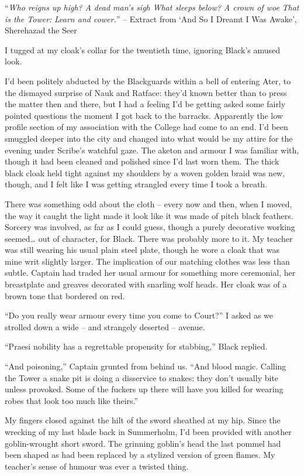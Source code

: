 \documentclass[12pt, openany]{book}
\begin{document}
“\textit{Who reigns up high?}
\textit{A dead man’s sigh}
\textit{What sleeps below?}
\textit{A crown of woe}
\textit{That is the Tower:}
\textit{Learn and cower.}”
– Extract from ‘And So I Dreamt I Was Awake’, Sherehazad the Seer

I tugged at my cloak’s collar for the twentieth time, ignoring Black’s amused look.

I’d been politely abducted by the Blackguards within a bell of entering Ater, to the dismayed surprise of Nauk and Ratface: they’d known better than to press the matter then and there, but I had a feeling I’d be getting asked some fairly pointed questions the moment I got back to the barracks. Apparently the low profile section of my association with the College had come to an end. I’d been smuggled deeper into the city and changed into what would be my attire for the evening under Scribe’s watchful gaze. The aketon and armour I was familiar with, though it had been cleaned and polished since I’d last worn them. The thick black cloak held tight against my shoulders by a woven golden braid was new, though, and I felt like I was getting strangled every time I took a breath. 

There was something odd about the cloth – every now and then, when I moved, the way it caught the light made it look like it was made of pitch black feathers. Sorcery was involved, as far as I could guess, though a purely decorative working seemed… out of character, for Black. There was probably more to it. My teacher was still wearing his usual plain steel plate, though he wore a cloak that was mine writ slightly larger. The implication of our matching clothes was less than subtle. Captain had traded her usual armour for something more ceremonial, her breastplate and greaves decorated with snarling wolf heads. Her cloak was of a brown tone that bordered on red.

“Do you really wear armour every time you come to Court?” I asked as we strolled down a wide – and strangely deserted – avenue.

“Praesi nobility has a regrettable propensity for stabbing,” Black replied.

“And poisoning,” Captain grunted from behind us. “And blood magic. Calling the Tower a snake pit is doing a disservice to snakes: they don’t usually bite unless provoked. Some of the fuckers up there will have you killed for wearing robes that look too much like theirs.”

My fingers closed against the hilt of the sword sheathed at my hip. Since the wrecking of my last blade back in Summerholm, I’d been provided with another goblin-wrought short sword. The grinning goblin’s head the last pommel had been shaped as had been replaced by a stylized version of green flames. My teacher’s sense of humour was ever a twisted thing.
\end{document}
